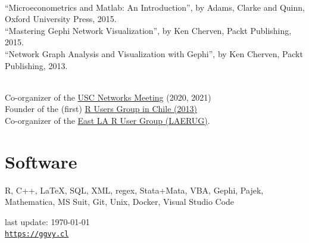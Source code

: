 \documentclass[letterpaper, 11pt]{article}
\def\footerlink{https://ggvy.cl}
\renewcommand{\textbf}[1]{{\bfseries\color{teal}#1}}
\begin{document}
\noindent\textbf{Book Review}\\
``Microeconometrics and Matlab: An Introduction'', by Adams, Clarke and Quinn, Oxford University Press, 2015.\\
``Mastering Gephi Network Visualization'', by Ken Cherven, Packt Publishing, 2015.\\
``Network Graph Analysis and Visualization with Gephi'', by Ken Cherven, Packt Publishing, 2013.\vspace{.5cm}

\noindent \textbf{Misc}\\
Co-organizer of the \href{https://networkanalysis.usc.edu}{USC Networks Meeting} (2020, 2021)\\
Founder of the (first) \href{https://www.meetup.com/useRchile/}{R Users Group in Chile (2013)}\\
Co-organizer of the \href{https://socalr.org}{East LA R User Group (LAERUG)}.

\section*{Software}

R, C++, \LaTeX, SQL, XML, regex, Stata+Mata, VBA, Gephi, Pajek, Mathematica, MS Suit, Git, Unix, Docker, Visual Studio Code

\bigskip

\begin{center}
 \begin{footnotesize}
   last update: \today \\
   \href{\footerlink}{\texttt{\footerlink}}
 \end{footnotesize}
\end{center}
\end{document}
